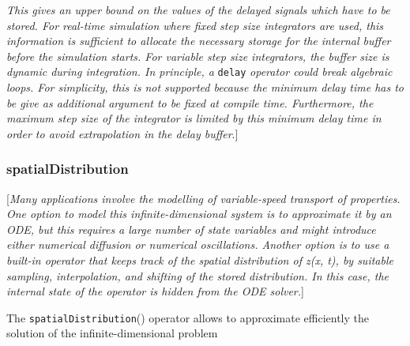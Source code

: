 \emph{This gives an upper bound on the values of the delayed signals
which have to be stored. For real-time simulation where fixed step size
integrators are used, this information is sufficient to allocate the
necessary storage for the internal buffer before the simulation starts.
For variable step size integrators, the buffer size is dynamic during
integration. In principle, a} \lstinline[basicstyle=\ttfamily]!delay! \emph{operator could break algebraic
loops. For simplicity, this is not supported because the minimum delay
time has to be give as additional argument to be fixed at compile time.
Furthermore, the maximum step size of the integrator is limited by this
minimum delay time in order to avoid extrapolation in the delay
buffer}.{]}

\subsubsection{spatialDistribution}

{[}\emph{Many applications involve the modelling of variable-speed
transport of properties. One option to model this infinite-dimensional
system is to approximate it by an ODE, but this requires a large number
of state variables and might introduce either numerical diffusion or
numerical oscillations. Another option is to use a built-in operator
that keeps track of the spatial distribution of z(x, t), by suitable
sampling, interpolation, and shifting of the stored distribution. In
this case, the internal state of the operator is hidden from the ODE
solver.}{]}

The \lstinline[basicstyle=\ttfamily]!spatialDistribution!() operator allows to approximate efficiently the
solution of the infinite-dimensional problem

